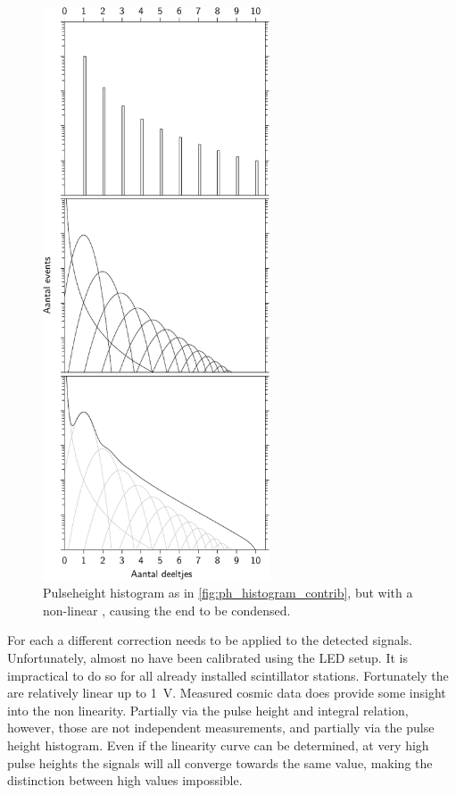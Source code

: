 \begin{figure}
    \centering
    \includegraphics[width=0.6\textwidth]
                    {plots/station/ph_histogram_contrib_nonlin}
    \caption{Pulseheight histogram as in \cref{fig:ph_histogram_contrib}, but with a non-linear \pmt, causing the end to be condensed.}
    \label{fig:ph_histogram_contrib_nonlin}
\end{figure}

For each \senstech \pmt a different correction needs to be applied to the detected signals. Unfortunately, almost no \pmts have been calibrated using the LED setup. It is impractical to do so for all already installed scintillator stations. Fortunately the \pmts are relatively linear up to \SI{1}{\volt}. Measured cosmic data does provide some insight into the non linearity. Partially via the pulse height and integral relation, however, those are not independent measurements, and partially via the pulse height histogram. Even if the linearity curve can be determined, at very high pulse heights the signals will all converge towards the same value, making the distinction between high values impossible.

